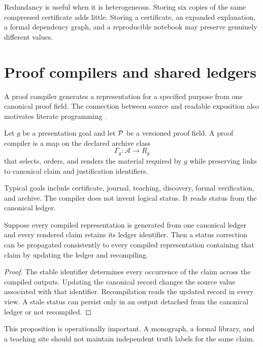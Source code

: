 Redundancy is useful when it is heterogeneous. Storing six copies of the same compressed certificate adds little. Storing a certificate, an expanded explanation, a formal dependency graph, and a reproducible notebook may preserve genuinely different values.


\section{Proof compilers and shared ledgers}
\label{PPT:sec:old12}

A proof compiler generates a representation for a specified purpose from one canonical proof field. The connection between source and readable exposition also motivates literate programming \cite{PPT:knuth}.

\begin{PPTdefinition}
\label{PPT:res:12:1}
Let $g$ be a presentation goal and let $\mathcal P$ be a versioned proof field. A proof compiler is a map on the declared archive class
\[
\Gamma_g:\mathscr A\longrightarrow R_g
\]
that selects, orders, and renders the material required by $g$ while preserving links to canonical claim and justification identifiers.
\end{PPTdefinition}

Typical goals include certificate, journal, teaching, discovery, formal verification, and archive. The compiler does not invent logical status. It reads status from the canonical ledger.

\begin{PPTproposition}
\label{PPT:res:12:2}
Suppose every compiled representation is generated from one canonical ledger and every rendered claim retains its ledger identifier. Then a status correction can be propagated consistently to every compiled representation containing that claim by updating the ledger and recompiling.
\end{PPTproposition}

\begin{proof}
The stable identifier determines every occurrence of the claim across the compiled outputs. Updating the canonical record changes the source value associated with that identifier. Recompilation reads the updated record in every view. A stale status can persist only in an output detached from the canonical ledger or not recompiled.
\end{proof}

This proposition is operationally important. A monograph, a formal library, and a teaching site should not maintain independent truth labels for the same claim.


